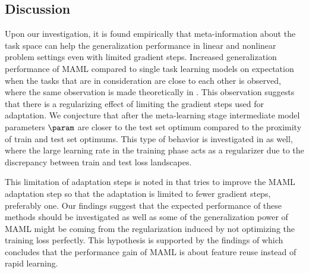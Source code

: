 \subsection{Discussion}

Upon our investigation, it is found empirically that meta-information about the task space can help the generalization performance in linear and nonlinear problem settings even with limited gradient steps. Increased generalization performance of MAML compared to single task learning models on expectation when the tasks that are in consideration are close to each other is observed, where the same observation is made theoretically in \cite{fallah2021}. This observation suggests that there is a regularizing effect of limiting the gradient steps used for adaptation. We conjecture that after the meta-learning stage intermediate model parameters $\param$ are closer to the test set optimum compared to the proximity of train and test set optimums. This type of behavior is investigated in \cite{nakkiran2020} as well, where the large learning rate in the training phase acts as a regularizer due to the discrepancy between train and test loss landscapes. 

This limitation of adaptation steps is noted in \cite{behl2019,li2017b} that tries to improve the MAML adaptation step so that the adaptation is limited to fewer gradient steps, preferably one. Our findings suggest that the expected performance of these methods should be investigated as well as some of the generalization power of MAML might be coming from the regularization induced by not optimizing the training loss perfectly. This hypothesis is supported by the findings of \cite{raghu2020} which concludes that the performance gain of MAML is about feature reuse instead of rapid learning.


